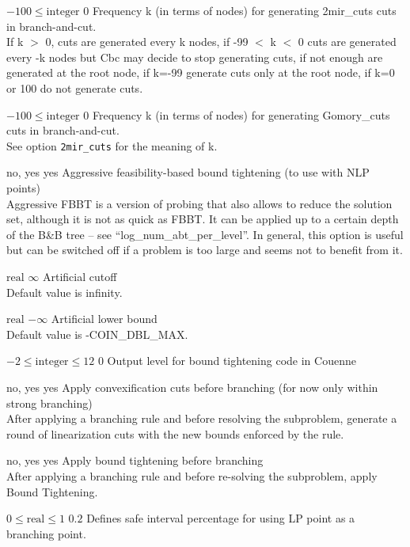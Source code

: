 %
{$-100\leq\textrm{integer}$}%
{$0$}%
{Frequency k (in terms of nodes) for generating 2mir\_cuts cuts in branch-and-cut.\\
If k $>$ 0, cuts are generated every k nodes, if -99 $<$ k $<$ 0 cuts are generated every -k nodes but Cbc may decide to stop generating cuts, if not enough are generated at the root node, if k=-99 generate cuts only at the root node, if k=0 or 100 do not generate cuts.}%
{}

%
{$-100\leq\textrm{integer}$}%
{$0$}%
{Frequency k (in terms of nodes) for generating Gomory\_cuts cuts in branch-and-cut.\\
See option \texttt{2mir\_cuts} for the meaning of k.}%
{}

%
{\ttfamily no, yes}%
{yes}%
{Aggressive feasibility-based bound tightening (to use with NLP points)\\
Aggressive FBBT is a version of probing that also allows to reduce the solution set, although it is not as quick as FBBT. It can be applied up to a certain depth of the B\&B tree -- see ``log\_num\_abt\_per\_level''. In general, this option is useful but can be switched off if a problem is too large and seems not to benefit from it.}%
{}

%
{$\textrm{real}$}%
{$\infty$}%
{Artificial cutoff\\
Default value is infinity.}%
{}

%
{$\textrm{real}$}%
{$-\infty$}%
{Artificial lower bound\\
Default value is -COIN\_DBL\_MAX.}%
{}

%
{$-2\leq\textrm{integer}\leq12$}%
{$0$}%
{Output level for bound tightening code in Couenne}%
{}

%
{\ttfamily no, yes}%
{yes}%
{Apply convexification cuts before branching (for now only within strong branching)\\
After applying a branching rule and before resolving the subproblem, generate a round of linearization cuts with the new bounds enforced by the rule.}%
{}

%
{\ttfamily no, yes}%
{yes}%
{Apply bound tightening before branching\\
After applying a branching rule and before re-solving the subproblem, apply Bound Tightening.}%
{}

%
{$0\leq\textrm{real}\leq1$}%
{$0.2$}%
{Defines safe interval percentage for using LP point as a branching point.}%
{}

